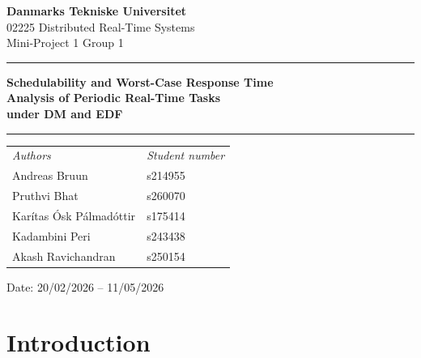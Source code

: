 \documentclass[a4paper,11pt]{article}
\begin{document}
\begin{titlepage}
\centering
\vspace*{1.5cm}

{\Large\bfseries Danmarks Tekniske Universitet}\\[4pt]
{\large 02225 Distributed Real-Time Systems}\\[2pt]
{\normalsize Mini-Project 1 \textbar{} Group 1}

\vspace{1.2cm}
\noindent\rule{\linewidth}{0.8pt}
\vspace{0.4cm}

{\huge\bfseries Schedulability and Worst-Case Response Time\\[8pt]
               Analysis of Periodic Real-Time Tasks\\[8pt]
               under DM and EDF}

\vspace{0.4cm}
\noindent\rule{\linewidth}{0.8pt}

\vspace{1.5cm}

\begin{tabular}{ll}
\textit{Authors}                     & \textit{Student number} \\[6pt]
Andreas Bruun                        & s214955 \\
Pruthvi Bhat                         & s260070 \\
Kar\'{i}tas \'{O}sk P\'{a}lmad\'{o}ttir & s175414 \\
Kadambini Peri                       & s243438 \\
Akash Ravichandran                   & s250154 \\
\end{tabular}

\vspace{2cm}
{\normalsize Date: 20/02/2026 -- 11/05/2026}

\end{titlepage}

\section{Introduction}
\end{document}

